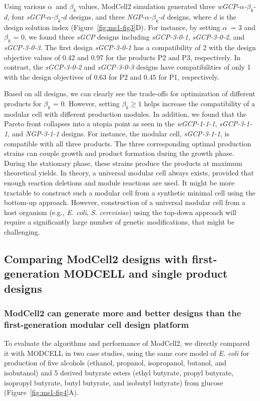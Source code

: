 Using various \(\alpha\)~and \(\beta_{k}\) values, ModCell2 simulation generated three \emph{wGCP}-\(\alpha\)\emph{-}\(\beta_{k}\)-\(d\), four \emph{sGCP}-\(\alpha\)\emph{-}\(\beta_{k}\)-\(d\) designs, and three \emph{NGP}-\(\alpha\)\emph{-}\(\beta_{k}\)-\(d\) designs, where \(d\) is the design solution index (Figure~\ref{fig:ms1-fig3}D).
For instance, by setting \(\alpha\)~= 3 and \(\beta_{k}\) = 0, we found three \emph{sGCP} designs including \emph{sGCP-3-0-1}, \emph{sGCP-3-0-2}, and \emph{sGCP-3-0-3}.
The first design \emph{sGCP-3-0-1} has a compatibility of 2 with the design objective values of 0.42 and 0.97 for the products P2 and P3, respectively.
In contrast, the \emph{sGCP-3-0-2} and \emph{sGCP-3-0-3} designs have compatibilities of only 1 with the design objectives of 0.63 for P2 and 0.45 for P1, respectively.

Based on all designs, we can clearly see the trade-offs for optimization of different products for \(\beta_{k}\) = 0.
However, setting \(\beta_{k} \geq 1\) helps increase the compatibility of a modular cell with different production modules.
In addition, we found that the Pareto front collapses into a utopia point as seen in the \emph{wGCP-1-1-1}, \emph{sGCP-3-1-1}, and \emph{NGP-3-1-1} designs.
For instance, the modular cell, \emph{sGCP-3-1-1}, is compatible with all three products.
The three corresponding optimal production strains can couple growth and product formation during the growth phase.
During the stationary phase, these strains produce the products at maximum theoretical yields.
In theory, a universal modular cell always exists, provided that enough reaction deletions and module reactions are used.
It might be more tractable to construct such a modular cell from a synthetic minimal cell using the bottom-up approach.
However, construction of a universal modular cell from a host organism (e.g., \emph{E.
coli}, \emph{S. cerevisiae}) using the top-down approach will require a significantly large number of genetic modifications, that might be challenging.


\subsection{Comparing ModCell2 designs with first-generation MODCELL and single product designs}

\subsubsection{ModCell2 can generate more and better designs than the
first-generation modular cell design platform}
To evaluate the algorithms and performance of ModCell2, we directly compared it with
MODCELL \citep{trinh2015} in two case studies, using the same
core model of \emph{E. coli} for production of five alcohols (ethanol,
propanol, isopropanol, butanol, and isobutanol) and 5 derived butyrate
esters (ethyl butyrate, propyl butyrate, isopropyl butyrate, butyl
butyrate, and isobutyl butyrate) from glucose (Figure~\ref{fig:ms1-fig4}A).

